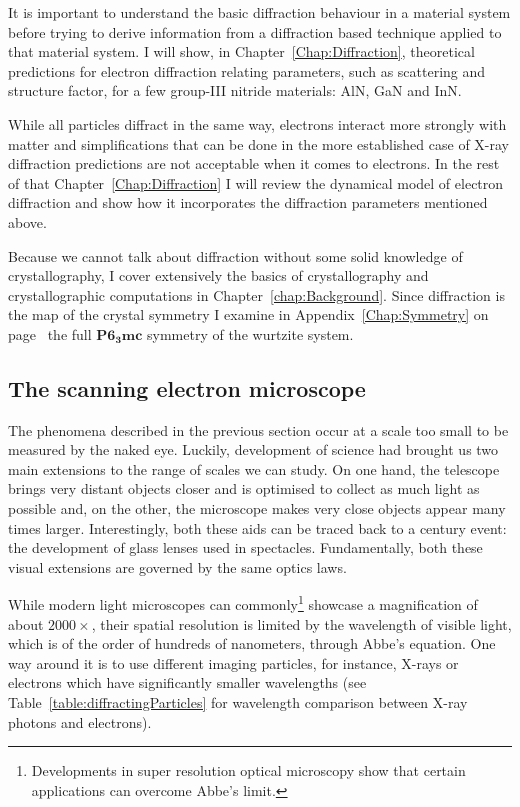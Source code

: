 It is important to understand the basic diffraction behaviour in a material system before trying to derive information from a diffraction based technique applied to that material system. I will show, in Chapter~\ref{Chap:Diffraction}, theoretical predictions for electron diffraction relating parameters, such as scattering and structure factor, for a few group-III nitride materials: AlN, GaN and InN. 

While all particles diffract in the same way, electrons interact more strongly with matter and simplifications that can be done in the more established case of X-ray diffraction predictions are not acceptable when it comes to electrons. In the rest of that Chapter~\ref{Chap:Diffraction} I will review the dynamical model of electron diffraction and show how it incorporates the diffraction parameters mentioned above.

Because we cannot talk about diffraction without some solid knowledge of crystallography, I cover extensively the basics of crystallography and crystallographic computations in Chapter~\ref{chap:Background}. Since diffraction is the map of the crystal symmetry I examine in Appendix~\ref{Chap:Symmetry} on page~\pageref{Chap:Symmetry} the full $\mathbf{P6_3mc}$ symmetry of the wurtzite system.  

\subsection{The scanning electron microscope}
\label{sec:sem}
The phenomena described in the previous section occur at a scale too small to be measured by the naked eye. Luckily,  development of science had brought us two main extensions  to the range of scales we can study. On one hand,  the telescope brings very distant objects closer and is optimised to collect as much light as possible and, on the other, the microscope makes very close objects appear many times larger.
Interestingly, both these aids can be traced back to a  century event: the development of glass lenses used in spectacles. Fundamentally, both these visual extensions are governed by the same optics laws. 

While modern light microscopes can commonly\footnote{ Developments in super resolution optical microscopy show that certain applications can overcome Abbe's limit.} showcase a magnification of about $2000\times$, their spatial resolution is limited by the wavelength of visible light, which is of the order of hundreds of nanometers, through Abbe's equation. One way around it is to use  different imaging particles, for instance, X-rays or electrons which have significantly smaller wavelengths (see Table~\ref{table:diffractingParticles} for wavelength comparison between X-ray photons and electrons).   

